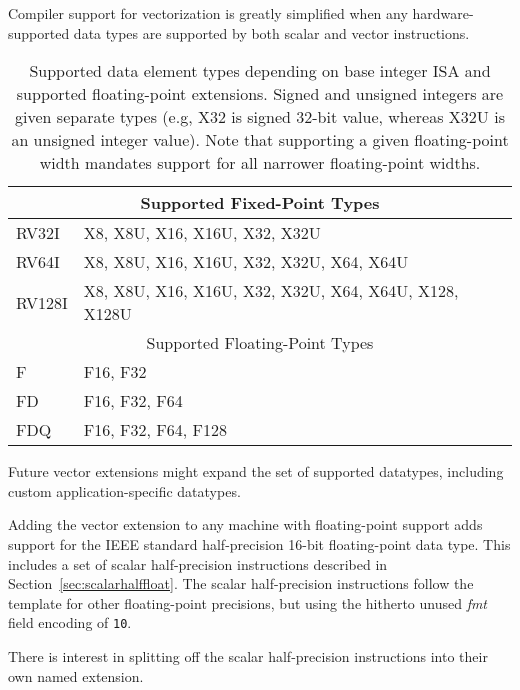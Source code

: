 \begin{commentary}
  Compiler support for vectorization is greatly simplified when any
  hardware-supported data types are supported by both scalar and
  vector instructions.
\end{commentary}

\begin{table}
  \centering
\begin{tabular}{|l|l|}
  \hline
  \multicolumn{2}{|c|}{Supported Fixed-Point Types} \\
  \hline
  RV32I  & X8, X8U, X16, X16U, X32, X32U \\
  RV64I  & X8, X8U, X16, X16U, X32, X32U, X64, X64U \\
  RV128I & X8, X8U, X16, X16U, X32, X32U, X64, X64U, X128, X128U \\
  \hline
  \hline
  \multicolumn{2}{|c|}{Supported Floating-Point Types} \\
  \hline
  F      & F16, F32 \\
  FD     & F16, F32, F64 \\
  FDQ    & F16, F32, F64, F128 \\
  \hline
\end{tabular}
\caption{Supported data element types depending on base integer ISA
  and supported floating-point extensions.  Signed and unsigned
  integers are given separate types (e.g, X32 is signed 32-bit value,
  whereas X32U is an unsigned integer value). Note that supporting a
  given floating-point width mandates support for all narrower
  floating-point widths.}
\label{tab:velemtypes}
\end{table}

\begin{commentary}
  Future vector extensions might expand the set of supported
  datatypes, including custom application-specific datatypes.
\end{commentary}

Adding the vector extension to any machine with floating-point support
adds support for the IEEE standard half-precision 16-bit
floating-point data type.  This includes a set of scalar
half-precision instructions described in
Section~\ref{sec:scalarhalffloat}.  The scalar half-precision
instructions follow the template for other floating-point precisions,
but using the hitherto unused {\em fmt} field encoding of {\tt 10}.

\begin{commentary}
  There is interest in splitting off the scalar half-precision
  instructions into their own named extension.
\end{commentary}


